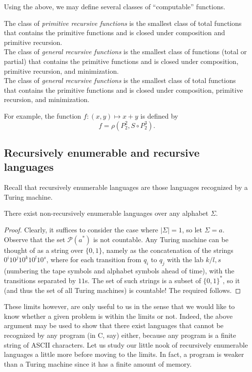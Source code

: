 	Using the above, we may define several classes of ``computable'' functions.

	\begin{fdef}
		The class of \emph{primitive recursive functions} is the smallest class of total functions that contains the primitive functions and is closed under composition and primitive recursion.\\
		The class of \emph{general recursive functions} is the smallest class of functions (total or partial) that contains the primitive functions and is closed under composition, primitive recursion, and minimization.\\
		The class of \emph{general recursive functions} is the smallest class of total functions that contains the primitive functions and is closed under composition, primitive recursion, and minimization.
	\end{fdef}

	For example, the function $f : (x,y) \mapsto x+y$ is defined by
	\[ f = \rho(P_2^2, S \circ P_2^3). \]

\subsection{Recursively enumerable and recursive languages}

	Recall that recursively enumerable languages are those languages recognized by a Turing machine.

	\begin{prop}
		\label{prop: exist non rec en langs}
		There exist non-recursively enumerable languages over any alphabet $\Sigma$.
	\end{prop}
	\begin{proof}
		Clearly, it suffices to consider the case where $|\Sigma| = 1$, so let $\Sigma = a$. Observe that the set $\mathcal{P}(a^*)$ is not countable. Any Turing machine can be thought of as a string over $\{0,1\}$, namely as the concatenation of the strings $0^i10^j10^k10^l10^s$, where for each transition from $q_i$ to $q_j$ with the lab $k/l,s$ (numbering the tape symbols and alphabet symbols ahead of time), with the transitions separated by $11$s. The set of such strings is a subset of $\{0,1\}^*$, so it (and thus the set of all Turing machines) is countable! The required follows.
	\end{proof}

	These limits however, are only useful to us in the sense that we would like to know whether a given problem is within the limits or not. Indeed, the above argument may be used to show that there exist languages that cannot be recognized by any program (in C, say) either, because any program is a finite string of ASCII characters. Let us study our little nook of recursively enumerable languages a little more before moving to the limits. In fact, a program is weaker than a Turing machine since it has a finite amount of memory.

